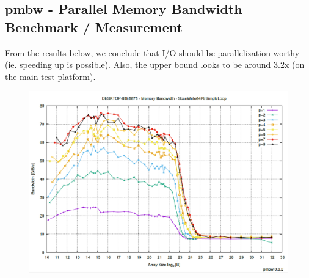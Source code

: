 \documentclass{acm_proc_article-sp}
\begin{document}
\subsection{pmbw - Parallel Memory Bandwidth Benchmark / Measurement}
From the results below, we conclude that I/O should be parallelization-worthy (ie. speeding up is possible). Also, the upper bound looks to be around 3.2x (on the main test platform).
\begin{figure}[H]
  \includegraphics[width=\linewidth,natwidth=1211,natheight=850]{pmbw.png}
  \label{fig:pmbw}
\end{figure}
\end{document}
